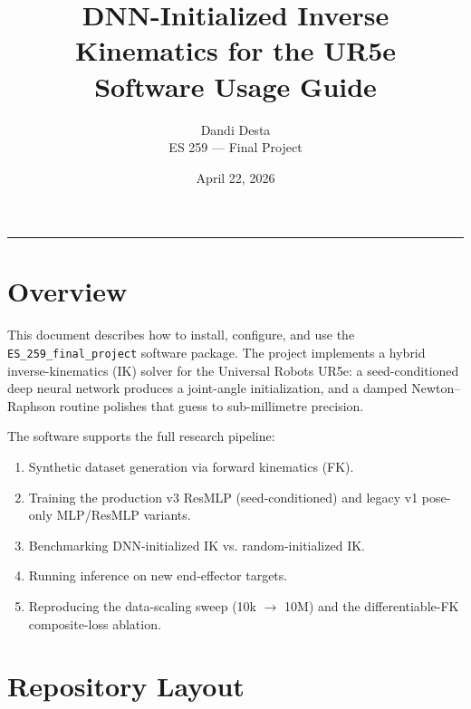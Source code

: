 \documentclass[11pt]{article}
\title{\textbf{DNN-Initialized Inverse Kinematics for the UR5e}\\
       \large Software Usage Guide}
\author{Dandi Desta \\ ES 259 --- Final Project}
\date{April 22, 2026}
\begin{document}
\maketitle

\tableofcontents
\vspace{1em}
\hrule
\vspace{1em}

\section{Overview}

This document describes how to install, configure, and use the
\texttt{ES\_259\_final\_project} software package. The project implements a
hybrid inverse-kinematics (IK) solver for the Universal Robots UR5e: a
seed-conditioned deep neural network produces a joint-angle initialization,
and a damped Newton--Raphson routine polishes that guess to
sub-millimetre precision.

The software supports the full research pipeline:
\begin{enumerate}[leftmargin=*]
    \item Synthetic dataset generation via forward kinematics (FK).
    \item Training the production v3 ResMLP (seed-conditioned) and legacy
          v1 pose-only MLP/ResMLP variants.
    \item Benchmarking DNN-initialized IK vs. random-initialized IK.
    \item Running inference on new end-effector targets.
    \item Reproducing the data-scaling sweep (10k $\rightarrow$ 10M) and
          the differentiable-FK composite-loss ablation.
\end{enumerate}

\section{Repository Layout}
\end{document}

